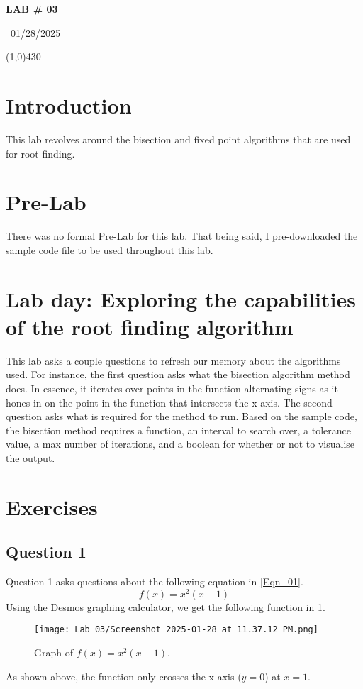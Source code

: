 \documentclass{article}
\begin{document}
\begin{center}
 \LARGE\bfseries LAB \# 03
\end{center}
\begin{center}
    ~01/28/2025~
\end{center}
 \line(1,0){430}

\section{Introduction}
This lab revolves around the bisection and fixed point algorithms that are used for root finding.

\section{Pre-Lab}
There was no formal Pre-Lab for this lab. That being said, I pre-downloaded the sample code file to be used throughout this lab.

\section{Lab day: Exploring the capabilities of the root finding algorithm}
This lab asks a couple questions to refresh our memory about the algorithms used. For instance, the first question asks what the bisection algorithm method does. In essence, it iterates over points in the function alternating signs as it hones in on the point in the function that intersects the x-axis. The second question asks what is required for the method to run. Based on the sample code, the bisection method requires a function, an interval to search over, a tolerance value, a max number of iterations, and a boolean for whether or not to visualise the output.


\section{Exercises}
\subsection{Question 1}
Question 1 asks questions about the following equation in \ref{Eqn_01}.
\begin{equation}
    f(x) = x^2(x-1)
\end{equation}
Using the Desmos graphing calculator, we get the following function in \ref{fig:enter-label}.
\newpage
\begin{figure}[h!]
    \centering
    \texttt{[image: Lab\_03/Screenshot 2025-01-28 at 11.37.12 PM.png]}
    \caption{Graph of \(f(x)=x^2(x-1).\)}
    \label{fig:enter-label}
\end{figure}
As shown above, the function only crosses the x-axis (\(y=0\)) at \(x=1\).
\end{document}
